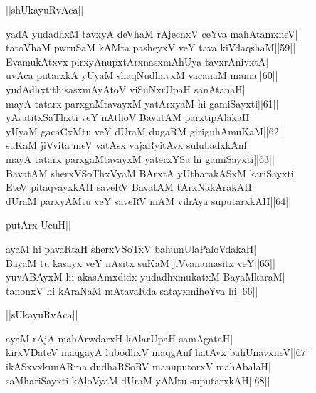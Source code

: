 \documentclass{article}
\begin{document}
\begin{center}
||shUkayuRvAca||
\end{center}

yadA yudadhxM tavxyA deVhaM rAjecnxV ceYva mahAtamxneV|\\
tatoVhaM pwruSaM kAMta pasheyxV veY tava kiVdaqshaM||59||\\
EvamukAtxvx pirxyAnupxtArxnasxmAhUya tavxrAnivxtA|\\
uvAca putarxkA yUyaM shaqNudhavxM vacanaM mama||60||\\
yudAdhxtithisasxmAyAtoV viSuNxrUpaH sanAtanaH|\\
mayA tatarx parxgaMtavayxM yatArxyaM hi gamiSayxti||61||\\
yAvatitxSaThxti veY nAthoV BavatAM parxtipAlakaH|\\
yUyaM gacaCxMtu veY dUraM dugaRM giriguhAmuKaM||62||\\
suKaM jiVvita meV vatAsx vajaRyitAvx sulubadxkAnf|\\
mayA tatarx parxgaMtavayxM yaterxYSa hi gamiSayxti||63||\\
BavatAM sherxVSoThxVyaM BArxtA yUtharakASxM kariSayxti|\\
EteV pitaqvayxkAH saveRV BavatAM tArxNakArakAH|\\
dUraM parxyAMtu veY saveRV mAM vihAya suputarxkAH||64||\\

\begin{center}
putArx UcuH||
\end{center}

ayaM hi pavaRtaH sherxVSoTxV bahumUlaPaloVdakaH|\\
BayaM tu kasayx veY nAsitx suKaM jiVvanamasitx veY||65||\\
yuvABAyxM hi akasAmxdidx yudadhxmukatxM BayaMkaraM|\\
tanonxV hi kAraNaM mAtavaRda satayxmiheYva hi||66||\\

\begin{center}
||sUkayuRvAca||
\end{center}

ayaM rAjA mahArwdarxH kAlarUpaH samAgataH|\\
kirxVDateV maqgayA lubodhxV maqgAnf hatAvx bahUnavxneV||67||\\
ikASxvxkunARma dudhaRSoRV manuputorxV mahAbalaH|\\
saMhariSayxti kAloVyaM dUraM yAMtu suputarxkAH||68||\\
\end{document}
